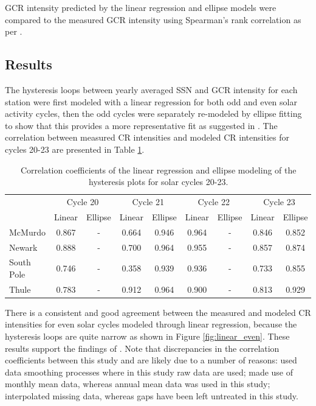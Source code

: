 GCR intensity predicted by the linear regression and ellipse models were compared to the measured GCR intensity using Spearman's rank correlation as per \citet{inceoglu_modeling_2014}.


\subsection{Results}

The hysteresis loops between yearly averaged SSN and GCR intensity for each station were first modeled with a linear regression for both odd and even solar activity cycles, then the odd cycles were separately re-modeled by ellipse fitting to show that this provides a more representative fit as suggested in \cite{inceoglu_modeling_2014}. The correlation between measured CR intensities and modeled CR intensities for cycles 20-23 are presented in Table \ref{table:hysteresis_20-23}.

\begin{table}[!ht]
	\begin{center}
	\caption{Correlation coefficients of the linear regression and ellipse modeling of the hysteresis plots for solar cycles 20-23.}
	\label{table:hysteresis_20-23}
	\begin{tabular}{l c c c c c c c c}
		\hline 
		{} & \multicolumn{2}{c}{Cycle 20} & \multicolumn{2}{c}{Cycle 21} & \multicolumn{2}{c}{Cycle 22} & \multicolumn{2}{c}{Cycle 23}\\
		{} & {Linear} & {Ellipse} & {Linear} & {Ellipse} & {Linear} & {Ellipse} & {Linear} & {Ellipse}\\ \hline
		{McMurdo} & {0.867} & {-} & {0.664} & {0.946} & {0.964} & {-} & {0.846} & {0.852} \\
		{Newark} & {0.888} & {-} & {0.700} & {0.964} & {0.955} & {-} & {0.857} & {0.874} \\
		{South Pole} & {0.746} & {-} & {0.358} & {0.939} & {0.936} & {-} & {0.733} & {0.855} \\
		{Thule} & {0.783} & {-} & {0.912} & {0.964}  & {0.900} & {-} & {0.813} & {0.929}\\ \hline
	\end{tabular}
	\end{center}
\end{table}

There is a consistent and good agreement between the measured and modeled CR intensities for even solar cycles modeled through linear regression, because the hysteresis loops are quite narrow as shown in Figure \ref{fig:linear_even}. These results support the findings of \cite{inceoglu_modeling_2014}. Note that discrepancies in the correlation coefficients between this study and \cite{inceoglu_modeling_2014} are likely due to a number of reasons: \cite{inceoglu_modeling_2014} used data smoothing processes where in this study raw data are used; \cite{inceoglu_modeling_2014} made use of monthly mean data, whereas annual mean data was used in this study; \cite{inceoglu_modeling_2014} interpolated missing data, whereas gaps have been left untreated in this study.

